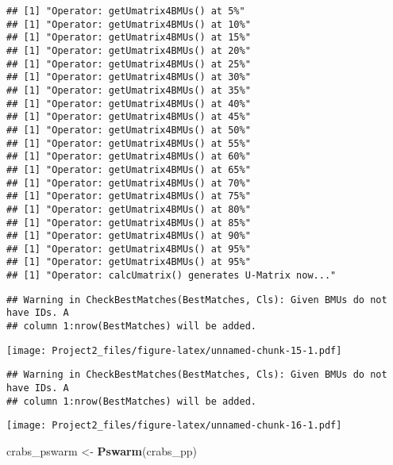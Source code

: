 \documentclass[
]{article}
\newenvironment{Shaded}{\begin{snugshade}}{\end{snugshade}}
\newcommand{\AttributeTok}[1]{\textcolor[rgb]{0.13,0.29,0.53}{#1}}
\newcommand{\DecValTok}[1]{\textcolor[rgb]{0.00,0.00,0.81}{#1}}
\newcommand{\FunctionTok}[1]{\textcolor[rgb]{0.13,0.29,0.53}{\textbf{#1}}}
\newcommand{\NormalTok}[1]{#1}
\newcommand{\OtherTok}[1]{\textcolor[rgb]{0.56,0.35,0.01}{#1}}
\newcommand{\SpecialCharTok}[1]{\textcolor[rgb]{0.81,0.36,0.00}{\textbf{#1}}}
\begin{document}
\begin{verbatim}
## [1] "Operator: getUmatrix4BMUs() at 5%"
## [1] "Operator: getUmatrix4BMUs() at 10%"
## [1] "Operator: getUmatrix4BMUs() at 15%"
## [1] "Operator: getUmatrix4BMUs() at 20%"
## [1] "Operator: getUmatrix4BMUs() at 25%"
## [1] "Operator: getUmatrix4BMUs() at 30%"
## [1] "Operator: getUmatrix4BMUs() at 35%"
## [1] "Operator: getUmatrix4BMUs() at 40%"
## [1] "Operator: getUmatrix4BMUs() at 45%"
## [1] "Operator: getUmatrix4BMUs() at 50%"
## [1] "Operator: getUmatrix4BMUs() at 55%"
## [1] "Operator: getUmatrix4BMUs() at 60%"
## [1] "Operator: getUmatrix4BMUs() at 65%"
## [1] "Operator: getUmatrix4BMUs() at 70%"
## [1] "Operator: getUmatrix4BMUs() at 75%"
## [1] "Operator: getUmatrix4BMUs() at 80%"
## [1] "Operator: getUmatrix4BMUs() at 85%"
## [1] "Operator: getUmatrix4BMUs() at 90%"
## [1] "Operator: getUmatrix4BMUs() at 95%"
## [1] "Operator: getUmatrix4BMUs() at 95%"
## [1] "Operator: calcUmatrix() generates U-Matrix now..."
\end{verbatim}

\begin{verbatim}
## Warning in CheckBestMatches(BestMatches, Cls): Given BMUs do not have IDs. A
## column 1:nrow(BestMatches) will be added.
\end{verbatim}

\texttt{[image: Project2\_files/figure-latex/unnamed-chunk-15-1.pdf]}

\begin{Shaded}
\end{Shaded}

\begin{verbatim}
## Warning in CheckBestMatches(BestMatches, Cls): Given BMUs do not have IDs. A
## column 1:nrow(BestMatches) will be added.
\end{verbatim}

\texttt{[image: Project2\_files/figure-latex/unnamed-chunk-16-1.pdf]}

\begin{Shaded}
\begin{Highlighting}[]
\NormalTok{crabs\_pswarm }\OtherTok{\textless{}{-}} \FunctionTok{Pswarm}\NormalTok{(crabs\_pp)}
\end{Highlighting}
\end{Shaded}
\end{document}
